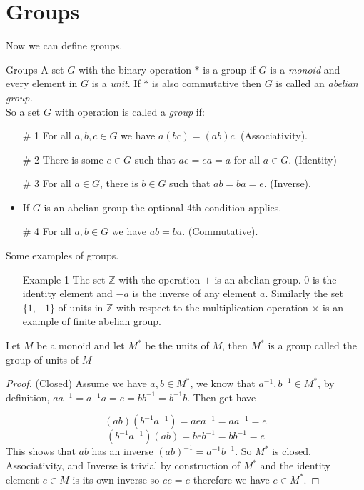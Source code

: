 \documentclass[16pt,a4paper]{article}
\theoremstyle{definition}
\begin{document}
\section{Groups}
Now we can define groups.
\begin{defn}{Groups}{}
A set $G$ with the binary operation $*$ is a group if $G$ is a \textit{monoid} and every element in $G$ is a \textit{unit}. If $*$ is also commutative then $G$ is called an \textit{abelian group.}
\\
So a set $G$ with operation is called a \textit{group} if:
\begin{itemize}
\item[\# 1] For all $a,b,c\in G$ we have $a(bc) = (ab)c$. (Associativity). 

\item[\# 2] There is some $e\in G$ such that $ae=ea=a$ for all $a\in G$. (Identity)

\item[\# 3] For all $a\in G$, there is $b\in G$ such that $ab=ba=e$. (Inverse). 

\item If $G$ is an abelian group the optional 4th condition applies.  

\item[\# 4] For all $a,b \in G$ we have $ab = ba$. (Commutative). 
\end{itemize}
\end{defn}
Some examples of groups. 
\begin{itemize} 
\item[Example 1] The set $\mathbb{Z}$ with the operation $+$ is an abelian group. $0$ is the identity element and $-a$ is the inverse of any element $a$. Similarly the set $\{1,-1\}$ of units in $\mathbb{Z}$ with respect to the multiplication operation $\times$ is an example of finite abelian group.   
\end{itemize}

\begin{thm}{}{}
Let $M$ be a monoid and let $M^*$ be the units of $M$, then $M^*$ is a group called the group of units of $M$
\end{thm}
\begin{proof}
(Closed) Assume we have $a,b\in M^*$, we know that $a^{-1}, b^{-1} \in M^*$, by definition, $aa^{-1}=a^{-1}a=e=bb^{-1}=b^{-1}b$. Then get have 

\[(ab)(b^{-1}a^{-1}) = aea^{-1} = aa^{-1}=e\]
\[(b^{-1}a^{-1})(ab) = beb^{-1} = bb^{-1}=e\]
This shows that $ab$ has an inverse $(ab)^{-1}=a^{-1}b^{-1}$. So $M^*$ is closed. \\

Associativity, and Inverse is trivial by construction of $M^*$ and the identity element $e\in M$ is its own inverse so $ee = e$ therefore we have $e\in M^*$. 



 
\end{proof}
\end{document}
